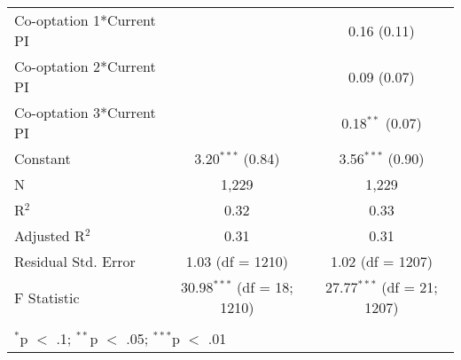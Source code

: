 \begin{table}[!htbp]
\begin{tabular}{@{\extracolsep{5pt}}lcc}
  Co-optation 1*Current PI &  & 0.16 (0.11) \\ 
  Co-optation 2*Current PI &  & 0.09 (0.07) \\ 
  Co-optation 3*Current PI &  & 0.18$^{**}$ (0.07) \\ 
  Constant & 3.20$^{***}$ (0.84) & 3.56$^{***}$ (0.90) \\ 
 N & 1,229 & 1,229 \\ 
R$^{2}$ & 0.32 & 0.33 \\ 
Adjusted R$^{2}$ & 0.31 & 0.31 \\ 
Residual Std. Error & 1.03 (df = 1210) & 1.02 (df = 1207) \\ 
F Statistic & 30.98$^{***}$ (df = 18; 1210) & 27.77$^{***}$ (df = 21; 1207) \\ 
\hline \\[-1.8ex] 
\multicolumn{3}{l}{$^{*}$p $<$ .1; $^{**}$p $<$ .05; $^{***}$p $<$ .01} \\ 
\end{tabular} 
\end{table} 
